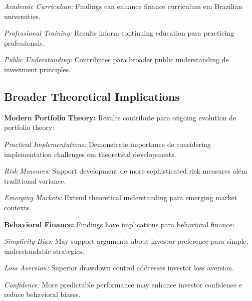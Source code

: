 \textit{Academic Curriculum:} Findings can enhance finance curriculum em Brazilian universities.

\textit{Professional Training:} Results inform continuing education para practicing professionals.

\textit{Public Understanding:} Contributes para broader public understanding de investment principles.

\subsection{Broader Theoretical Implications}

\textbf{Modern Portfolio Theory:} Results contribute para ongoing evolution de portfolio theory:

\textit{Practical Implementations:} Demonstrate importance de considering implementation challenges em theoretical developments.

\textit{Risk Measures:} Support development de more sophisticated risk measures além traditional variance.

\textit{Emerging Markets:} Extend theoretical understanding para emerging market contexts.

\textbf{Behavioral Finance:} Findings have implications para behavioral finance:

\textit{Simplicity Bias:} May support arguments about investor preference para simple, understandable strategies.

\textit{Loss Aversion:} Superior drawdown control addresses investor loss aversion.

\textit{Confidence:} More predictable performance may enhance investor confidence e reduce behavioral biases.

